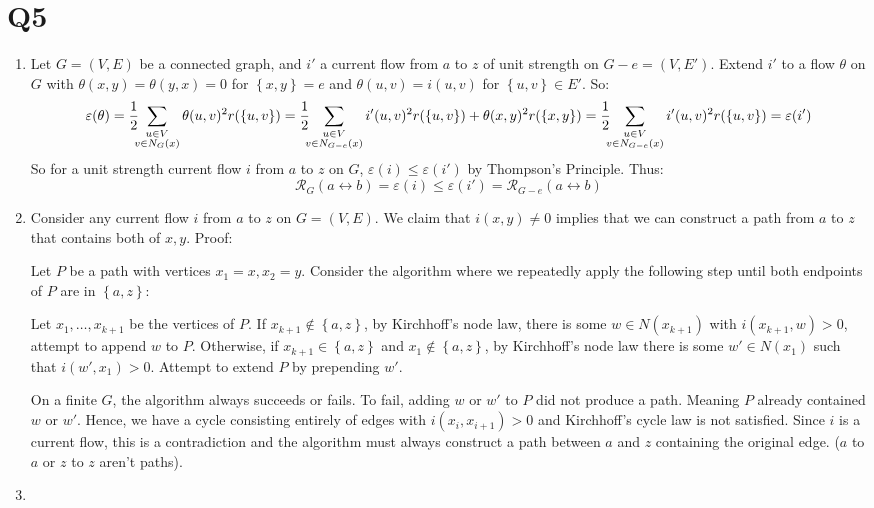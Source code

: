 \documentclass[a4paper, 11pt]{article}
\def\set#1{\left\{ #1 \right\}}
\begin{document}
\section*{Q5}
\begin{enumerate}[label=(\alph*)]
	\item
		Let $G=(V,E)$ be a connected graph, and $i'$ a current flow from $a$ to $z$ of unit strength on $G-e=(V,E')$. Extend $i'$ to a flow $\theta$ on $G$ with $\theta(x,y)=\theta(y,x)=0$ for $\set{x,y}=e$ and $\theta(u,v)=i(u,v)$ for $\set{u,v}\in E'$. So:
	      \[
		      \varepsilon(\theta)
		      =\frac12\hspace{-0.5em}\sum_{\substack{u\in V\\ v\in N_G(x)}}\theta(u,v)^2r(\set{u,v})
		      =\frac12\hspace{-0.5em}\sum_{\substack{u\in V\\ v\in N_{G-e}(x)}}i'(u,v)^2r(\set{u,v}) + \theta(x,y)^2r(\set{x,y})
		      =\frac12\hspace{-0.5em}\sum_{\substack{u\in V\\ v\in N_{G-e}(x)}}i'(u,v)^2r(\set{u,v})
			  =\varepsilon(i')
	      \]
		So for a unit strength current flow $i$ from $a$ to $z$ on $G$, $\varepsilon(i)\leq\varepsilon(i')$ by Thompson's Principle. Thus:
		$$\mathcal{R}_G(a\leftrightarrow b)=\varepsilon(i)\leq\varepsilon(i')= \mathcal{R}_{G-e}(a\leftrightarrow b)$$

	\item 
		Consider any current flow $i$ from $a$ to $z$ on $G=(V,E)$. We claim that $i(x,y)\neq0$ implies that we can construct a path from $a$ to $z$ that contains both of $x,y$. Proof:
		\begin{mdframed}
			Let $P$ be a path with vertices $x_1=x,x_2=y$. Consider the algorithm where we repeatedly apply the following step until both endpoints of $P$ are in $\set{a,z}$:
			
			Let $x_1,\dots,x_{k+1}$ be the vertices of $P$. If $x_{k+1}\notin\set{a,z}$, by Kirchhoff's node law, there is some $w\in N(x_{k+1})$ with $i(x_{k+1},w)>0$, attempt to append $w$ to $P$. Otherwise, if $x_{k+1}\in\set{a,z}$ and $x_1\notin\set{a,z}$, by Kirchhoff's node law there is some $w'\in N(x_1)$ such that $i(w',x_1)>0$. Attempt to extend $P$ by prepending $w'$.

			On a finite $G$, the algorithm always succeeds or fails. To fail, adding $w$ or $w'$ to $P$ did not produce a path. Meaning $P$ already contained $w$ or $w'$. Hence, we have a cycle consisting entirely of edges with $i(x_{i},x_{i+1})>0$ and Kirchhoff's cycle law is not satisfied. Since $i$ is a current flow, this is a contradiction and the algorithm must always construct a path between $a$ and $z$ containing the original edge. ($a$ to $a$ or $z$ to $z$ aren't paths). 
		\end{mdframed}
		\pagebreak
	   
		\item

\end{enumerate}
\end{document}
